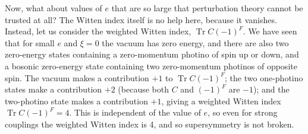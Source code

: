 Now, what about values of \(e\) that are so large that perturbation theory
cannot be trusted at all? The Witten index itself is no help here, because it
vanishes. Instead, let us consider the weighted Witten index,
\(\operatorname{Tr}C(-1)^F\). We have seen that for small \(e\) and
\(\xi=0\) the vacuum has zero energy, and there are also two zero-energy
states containing a zero-momentum photino of spin up or down, and a bosonic
zero-energy state containing two zero-momentum photinos of opposite spin.
The vacuum makes a contribution \(+1\) to \(\operatorname{Tr}C(-1)^F\);
the two one-photino states make a contribution \(+2\) (because both \(C\)
and \((-1)^F\) are \(-1\)); and the two-photino state makes a contribution
\(+1\), giving a weighted Witten index
\(\operatorname{Tr}C(-1)^F=4\). This is independent of the value of \(e\),
so even for strong couplings the weighted Witten index is 4, and so
supersymmetry is not broken.

